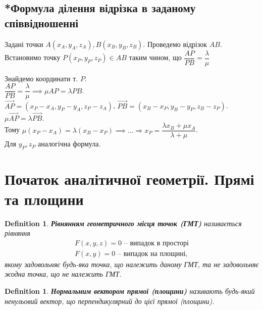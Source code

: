 \documentclass[a4paper, 10pt]{extarticle}
\theoremstyle{theoremdd}
\theoremstyle{theoremdd}
\newtheorem{definition}[theorem]{Definition}
\theoremstyle{theoremdd}
\theoremstyle{theoremdd}
\theoremstyle{theoremdd}
\theoremstyle{theoremdd}
\theoremstyle{theoremdd}
\theoremstyle{theoremdd}
\begin{document}
\subsection{*Формула ділення відрізка в заданому співвідношенні}
Задані точки $A(x_A,y_A,z_A), B(x_B,y_B,z_B)$. Проведемо відрізок $AB$. Встановимо точку $P(x_P,y_P,z_P) \in AB$ таким чином, що $\dfrac{AP}{PB} = \dfrac{\lambda}{\mu}$
\begin{figure}[H]
\centering
{}
\end{figure}
Знайдемо координати т. $P$.\\
$\dfrac{AP}{PB} = \dfrac{\lambda}{\mu} \implies \mu AP = \lambda PB$.\\
$\overrightarrow{AP} = (x_P - x_A, y_P - y_A, z_P - z_A)$, $\overrightarrow{PB} = (x_B - x_P, y_B - y_P, z_B - z_P)$.\\
$\mu \overrightarrow{AP} = \lambda \overrightarrow{PB}$.\\
Тому $\mu (x_P - x_A) = \lambda (x_B - x_P) \implies \dots \Rightarrow x_P = \dfrac{\lambda x_B + \mu x_A}{\lambda + \mu}$.\\
Для $y_P, z_P$ аналогічна формула.
\fi
\newpage

\section{Початок аналітичної геометрії. Прямі та площини}
\begin{definition}
\textbf{Рівнянням геометричного місця точок (ГМТ)} називається рівняння
\begin{align*}
F(x,y,z) = 0 \text{ -- випадок в просторі} \\
F(x,y) = 0 \text{ -- випадок на площині},
\end{align*}
якому задовольняє будь-яка точка, що належить даному ГМТ, та не задовольняє жодна точка, що не належить ГМТ.
\end{definition}

\begin{definition}
\textbf{Нормальним вектором прямої (площини)} називають будь-який ненульовий вектор, що перпендикулярний до цієї прямої (площини).
\end{definition}
\end{document}
